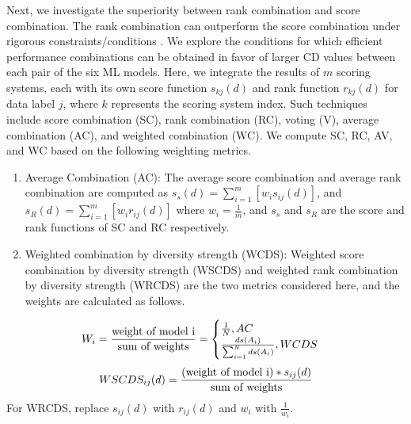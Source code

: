 Next, we investigate the superiority between rank combination and score combination. The rank combination can outperform the score combination under rigorous constraints/conditions \cite{hsu2010rank}. We explore the conditions for which efficient performance combinations can be obtained in favor of larger CD values between each pair of the six ML models. Here, we integrate the results of $m$ scoring systems, each with its own score function $s_{kj}(d)$ and rank function $r_{kj}(d)$ for data label $j$, where $k$ represents the scoring system index. Such techniques include score combination (SC), rank combination (RC), voting (V), average combination (AC), and weighted combination (WC). We compute SC, RC, AV, and WC based on the following weighting metrics.
\begin{enumerate}
    \item Average Combination (AC): The average score combination and average rank combination are computed as $s_s(d) = \sum_{i=1}^m [w_is_{ij}(d)]$, and $s_R(d) = \sum_{i=1}^m [w_ir_{ij}(d)]$ where $w_i = \frac{1}{m}$, and $s_s$ and $s_R$ are the score and rank functions of SC and RC respectively.
    \item Weighted combination by diversity strength (WCDS): Weighted score combination by diversity strength (WSCDS) and weighted rank combination by diversity strength (WRCDS) are the two metrics considered here, and the weights are calculated as follows.
\end{enumerate}

\begin{equation}
    W_i = \frac{\textnormal{weight of model  i}}{\textnormal{sum of weights}}  = \begin{cases}
                    \frac{1}{N}, AC \\
                    \frac{ds(A_i)}{\sum_{i=1}^N ds(A_i)}, WCDS
                    
                \end{cases}
\end{equation}
$$WSCDS_{ij}(d) = \frac{(\textnormal{weight of model  i}) * s_{ij}(d)}{\textnormal{sum of weights}}$$
For WRCDS, replace $s_{ij}(d)$ with $r_{ij}(d)$ and $w_i$ with $\frac{1}{w_i}$.